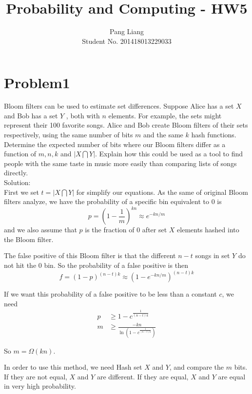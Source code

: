 \documentclass[12pt]{article}
\title{Probability and Computing - HW5}
\author{Pang Liang\\ Student No. 201418013229033}
\begin{document}
\maketitle

\section{Problem1}
Bloom filters can be used to estimate set differences. Suppose Alice has a set $X$ and Bob has a set $Y$ , both with $n$ elements. For example, the sets might represent their 100 favorite songs. Alice and Bob create Bloom filters of their sets respectively, using the same number of bits $m$ and the same $k$ hash functions. Determine the expected number of bits where our Bloom filters differ as a function of $m, n, k$ and $|X \bigcap Y|$. Explain how this could be used as a tool to find people with the same taste in music more easily than comparing lists of songs directly.\\

Solution:\\
First we set $t=|X \bigcap Y|$ for simplify our equations. As the same of original Bloom filters analyze, we have the probability of a specific bin equivalent to 0 is
\begin{equation}
    p = (1-\frac{1}{m})^{kn} \approx e^{-kn/m}
\end{equation}
and we also assume that $p$ is the fraction of 0 after set $X$ elements hashed into the Bloom filter.

The false positive of this Bloom filter is that the different $n-t$ songs in set $Y$ do not hit the 0 bin. So the probability of a false positive is then
\begin{equation}
    f = (1-p)^{(n-t)k} \approx (1-e^{-kn/m})^{(n-t)k}
\end{equation}

If we want this probability of a false positive to be less than a constant $c$, we need
\begin{equation}
    \begin{split}
    p &\ge 1 - c^{\frac{1}{(n-t)k}}\\
    m &\ge \frac{-kn}{\ln (1-c^{\frac{1}{(n-t)k}})}
    \end{split}
\end{equation}

So $m=\Omega(kn)$.

In order to use this method, we need Hash set $X$ and $Y$, and compare the $m$ bits. If they are not equal, $X$ and $Y$ are different. If they are equal, $X$ and $Y$ are equal in very high probability.
\end{document}
